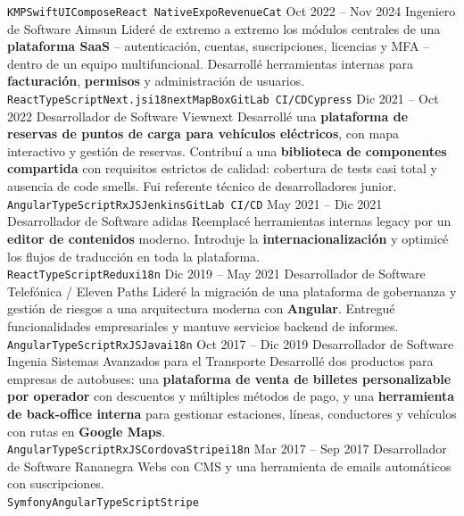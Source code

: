 \documentclass[9pt]{developercv} %
\begin{document}
\begin{entrylist}
{		\texttt{KMP}\slashsep\texttt{SwiftUI}\slashsep\texttt{Compose}\slashsep\texttt{React Native}\slashsep\texttt{Expo}\slashsep\texttt{RevenueCat}}
	\entry
		{Oct 2022 -- Nov 2024}
		{Ingeniero de Software}
		{Aimsun}
		{Lideré de extremo a extremo los módulos centrales de una \textbf{plataforma SaaS} -- autenticación, cuentas, suscripciones, licencias y MFA -- dentro de un equipo multifuncional. Desarrollé herramientas internas para \textbf{facturación}, \textbf{permisos} y administración de usuarios. \\
		\texttt{React}\slashsep\texttt{TypeScript}\slashsep\texttt{Next.js}\slashsep\texttt{i18next}\slashsep\texttt{MapBox}\slashsep\texttt{GitLab CI/CD}\slashsep\texttt{Cypress}}
	\entry
		{Dic 2021 -- Oct 2022}
		{Desarrollador de Software}
		{Viewnext}
		{Desarrollé una \textbf{plataforma de reservas de puntos de carga para vehículos eléctricos}, con mapa interactivo y gestión de reservas. Contribuí a una \textbf{biblioteca de componentes compartida} con requisitos estrictos de calidad: cobertura de tests casi total y ausencia de code smells. Fui referente técnico de desarrolladores junior. \\
		\texttt{Angular}\slashsep\texttt{TypeScript}\slashsep\texttt{RxJS}\slashsep\texttt{Jenkins}\slashsep\texttt{GitLab CI/CD}}
	\entry
		{May 2021 -- Dic 2021}
		{Desarrollador de Software}
		{adidas}
		{Reemplacé herramientas internas legacy por un \textbf{editor de contenidos} moderno. Introduje la \textbf{internacionalización} y optimicé los flujos de traducción en toda la plataforma. \\
		\texttt{React}\slashsep\texttt{TypeScript}\slashsep\texttt{Redux}\slashsep\texttt{i18n}}
	\entry
		{Dic 2019 -- May 2021}
		{Desarrollador de Software}
		{Telefónica / Eleven Paths}
		{Lideré la migración de una plataforma de gobernanza y gestión de riesgos a una arquitectura moderna con \textbf{Angular}. Entregué funcionalidades empresariales y mantuve servicios backend de informes. \\
		\texttt{Angular}\slashsep\texttt{TypeScript}\slashsep\texttt{RxJS}\slashsep\texttt{Java}\slashsep\texttt{i18n}}
	\entry
		{Oct 2017 -- Dic 2019}
		{Desarrollador de Software}
		{Ingenia Sistemas Avanzados para el Transporte}
		{Desarrollé dos productos para empresas de autobuses: una \textbf{plataforma de venta de billetes personalizable por operador} con descuentos y múltiples métodos de pago, y una \textbf{herramienta de back-office interna} para gestionar estaciones, líneas, conductores y vehículos con rutas en \textbf{Google Maps}. \\
		\texttt{Angular}\slashsep\texttt{TypeScript}\slashsep\texttt{RxJS}\slashsep\texttt{Cordova}\slashsep\texttt{Stripe}\slashsep\texttt{i18n}}
	\entry
		{Mar 2017 -- Sep 2017}
		{Desarrollador de Software}
		{Rananegra}
		{Webs con CMS y una herramienta de emails automáticos con suscripciones. \\
		\texttt{Symfony}\slashsep\texttt{Angular}\slashsep\texttt{TypeScript}\slashsep\texttt{Stripe}}
\end{entrylist}
\end{document}

